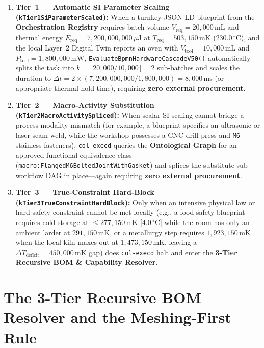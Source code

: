 \begin{enumerate}
    \item \textbf{Tier~1 --- Automatic SI Parameter Scaling (\texttt{kTier1SiParameterScaled}):} When a turnkey JSON-LD blueprint from the \textbf{Orchestration Registry} requires batch volume $V_{\mathrm{req}} = 20{,}000\,\mathrm{mL}$ and thermal energy $E_{\mathrm{req}} = 7{,}200{,}000{,}000\,\mu\mathrm{J}$ at $T_{\mathrm{req}} = 503{,}150\,\mathrm{mK}$ ($230.0\,^\circ\mathrm{C}$), and the local Layer~2 Digital Twin reports an oven with $V_{\mathrm{tool}} = 10{,}000\,\mathrm{mL}$ and $P_{\mathrm{tool}} = 1{,}800{,}000\,\mathrm{mW}$, \texttt{EvaluateBpmnHardwareCascadeV50()} automatically splits the task into $k = \lceil 20{,}000 / 10{,}000 \rceil = 2$ sub-batches and scales the duration to $\Delta t = 2 \times (7{,}200{,}000{,}000 / 1{,}800{,}000) = 8{,}000\,\mathrm{ms}$ (or appropriate thermal hold time), requiring \textbf{zero external procurement}.
    \item \textbf{Tier~2 --- Macro-Activity Substitution (\texttt{kTier2MacroActivitySpliced}):} When scalar SI scaling cannot bridge a process modality mismatch (for example, a blueprint specifies an ultrasonic or laser seam weld, while the workshop possesses a CNC drill press and \texttt{M6} stainless fasteners), \texttt{col-execd} queries the \textbf{Ontological Graph} for an approved functional equivalence class (\texttt{macro:FlangedM6BoltedJointWithGasket}) and splices the substitute sub-workflow DAG in place---again requiring \textbf{zero external procurement}.
    \item \textbf{Tier~3 --- True-Constraint Hard-Block (\texttt{kTier3TrueConstraintHardBlock}):} Only when an intensive physical law or hard safety constraint cannot be met locally (e.g., a food-safety blueprint requires cold storage at $\le 277{,}150\,\mathrm{mK}$ [$4.0\,^\circ\mathrm{C}$] while the room has only an ambient larder at $291{,}150\,\mathrm{mK}$, or a metallurgy step requires $1{,}923{,}150\,\mathrm{mK}$ when the local kiln maxes out at $1{,}473{,}150\,\mathrm{mK}$, leaving a $\Delta T_{\mathrm{deficit}} = 450{,}000\,\mathrm{mK}$ gap) does \texttt{col-execd} halt and enter the \textbf{3-Tier Recursive BOM \& Capability Resolver}.
\end{enumerate}

\section{The 3-Tier Recursive BOM Resolver and the Meshing-First Rule}
\label{sec:l7-recursive-bom}

